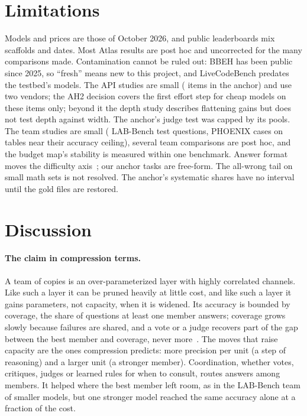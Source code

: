 \documentclass{article}
\begin{document}
\section{Limitations}
\label{sec:limits}

Models and prices are those of October 2026, and public leaderboards mix scaffolds and dates. Most Atlas results are
post hoc and uncorrected for the many comparisons made. Contamination cannot be ruled out: BBEH has been public since
2025, so ``fresh'' means new to this project, and LiveCodeBench predates the testbed's models. The API studies are small
( items in the anchor) and use two vendors; the AH2 decision covers the first effort step for cheap
models on these items only; beyond it the depth study describes flattening gains but does not test depth against
width. The anchor's judge test was capped by its pools. The team studies are small ( LAB-Bench test
questions,  PHOENIX cases on tables near their accuracy ceiling), several team comparisons are post hoc, and
the budget map's stability is measured within one benchmark. Answer
format moves the difficulty axis~\cite{chen2026cofailure}; our anchor tasks are free-form. The all-wrong tail on small
math sets is not resolved. The anchor's systematic shares have no interval until the gold files are restored.

\section{Discussion}
\label{sec:conclusion}

\paragraph{The claim in compression terms.} A team of copies is an over-parameterized layer with highly correlated
channels. Like such a layer it can be pruned heavily at little cost, and like such a layer it gains parameters, not
capacity, when it is widened. Its accuracy is bounded by coverage, the share of questions at least one member answers;
coverage grows slowly because failures are shared, and a vote or a judge recovers part of the gap between the best
member and coverage, never more~\citep{brown2024monkeys,chen2026cofailure}. The moves that raise capacity are the ones
compression predicts: more precision per unit (a step of reasoning) and a larger unit (a stronger member).
Coordination, whether votes, critiques, judges or learned rules for when to consult, routes answers among members. It
helped where the best member left room, as in the LAB-Bench team of smaller models, but one stronger model reached the
same accuracy alone at a fraction of the cost.
\end{document}
